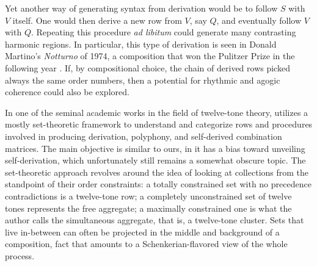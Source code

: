 Yet another way of generating syntax from derivation would be to follow $S$ with $V$ itself. One would then derive a new row from $V$, say $Q$, and eventually follow $V$ with $Q$. Repeating this procedure \emph{ad libitum} could generate many contrasting harmonic regions. In particular, this type of derivation is seen in Donald Martino's \emph{Notturno} of 1974, a composition that won the Pulitzer Prize in the following year \cite[181]{Starr1984}. If, by compositional choice, the chain of derived rows picked always the same order numbers, then a potential for rhythmic and agogic coherence could also be explored.

In one of the seminal academic works in the field of twelve-tone theory, \cite{Starr1984} utilizes a mostly set-theoretic framework to understand and categorize rows and procedures involved in producing derivation, polyphony, and self-derived combination matrices. The main objective is similar to ours, in it has a bias toward unveiling self-derivation, which unfortunately still remains a somewhat obscure topic. The set-theoretic approach revolves around the idea of looking at collections from the standpoint of their order constraints: a totally constrained set with no precedence contradictions is a twelve-tone row; a completely unconstrained set of twelve tones represents the free aggregate; a maximally constrained one is what the author calls the simultaneous aggregate, that is, a twelve-tone cluster. Sets that live in-between can often be projected in the middle and background of a composition, fact that amounts to a Schenkerian-flavored view of the whole process.

